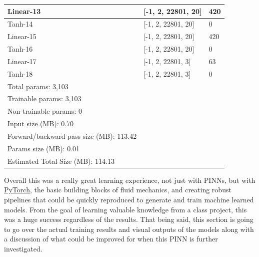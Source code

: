 \documentclass{article}
\begin{document}
\begin{table}[H]
\begin{tabular}{lll}
		\hline
		\multicolumn{1}{|l|}{Linear-13}              &
		\multicolumn{1}{l|}{{[}-1, 2, 22801, 20{]}}  & \multicolumn{1}{l|}{420}      \\
		\hline
		\multicolumn{1}{|l|}{Tanh-14}                &
		\multicolumn{1}{l|}{{[}-1, 2, 22801, 20{]}}  & \multicolumn{1}{l|}{0}        \\
		\hline
		\multicolumn{1}{|l|}{Linear-15}              &
		\multicolumn{1}{l|}{{[}-1, 2, 22801, 20{]}}  & \multicolumn{1}{l|}{420}      \\
		\hline
		\multicolumn{1}{|l|}{Tanh-16}                &
		\multicolumn{1}{l|}{{[}-1, 2, 22801, 20{]}}  & \multicolumn{1}{l|}{0}        \\
		\hline
		\multicolumn{1}{|l|}{Linear-17}              &
		\multicolumn{1}{l|}{{[}-1, 2, 22801, 3{]}}   & \multicolumn{1}{l|}{63}       \\
		\hline
		\multicolumn{1}{|l|}{Tanh-18}                &
		\multicolumn{1}{l|}{{[}-1, 2, 22801, 3{]}}   & \multicolumn{1}{l|}{0}        \\
		\hline
		\multicolumn{1}{|l}{Total params: 3,103}     &
		                                             & \multicolumn{1}{l|}{}         \\
		\multicolumn{1}{|l}{Trainable params: 3,103} &
		                                             & \multicolumn{1}{l|}{}         \\
		\multicolumn{1}{|l}{Non-trainable params: 0} &
		                                             & \multicolumn{1}{l|}{}         \\ \hline
		Input size (MB): 0.70                        &
		                                             &                               \\
		Forward/backward pass size (MB): 113.42      &
		                                             &                               \\
		Params size (MB): 0.01                       &
		                                             &                               \\
		Estimated Total Size (MB): 114.13            &
		                                             &
	\end{tabular}
\end{table}

Overall this was a really great learning experience, not just with
PINNs, but with \href{https://pytorch.org/}{PyTorch}, the basic building blocks
of fluid mechanics,
and creating robust pipelines that could be quickly reproduced to
generate and train machine learned models. From the goal of learning valuable
knowledge from a class project, this was a huge success regardless of the
results. That being said, this section is going to go over the actual training
results and visual outputs of the models along with a discussion of what could
be improved for when this PINN is further investigated. \\
\end{document}
